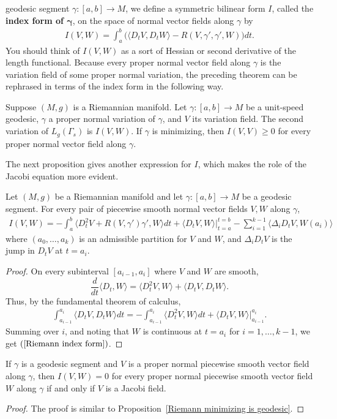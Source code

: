 geodesic segment $\gamma:[a,b]\to M$, we define a symmetric bilinear form $I$, called the \textbf{index form of $\bm{\gamma}$}, on the space of normal vector fields 
along $\gamma$ by
\begin{align}
I(V,W)=\int_a^b\big(\langle D_tV,D_tW\rangle-R(V,\gamma',\gamma',W)\big)dt.
\end{align}
You should think of $I(V,W)$ as a sort of Hessian or second derivative of the length functional. Because every proper normal vector field along $\gamma$ is the variation 
field of some proper normal variation, the preceding theorem can be rephrased in terms of the index form in the following way.
\begin{corollary}
Suppose $(M,g)$ is a Riemannian manifold. Let $\gamma:[a,b]\to M$ be a unit-speed geodesic, $\gamma$ a proper normal variation of $\gamma$, and $V$ its variation field. 
The second variation of $L_g(\Gamma_s)$ is $I(V,W)$. If $\gamma$ is minimizing, then $I(V,V)\geq 0$ for every proper normal vector field along $\gamma$.
\end{corollary}
The next proposition gives another expression for $I$, which makes the role of the Jacobi equation more evident.
\begin{proposition}
Let $(M,g)$ be a Riemannian manifold and let $\gamma:[a,b]\to M$ be a geodesic segment. For every pair of piecewise smooth normal vector fields $V,W$ along $\gamma$,
\begin{align}\label{Riemann index form}
I(V,W)=-\int_a^b\langle D_t^2V+R(V,\gamma')\gamma',W\rangle dt+\langle D_tV,W\rangle\Big|_{t=a}^{t=b}-\sum_{i=1}^{k-1}\langle\Delta_iD_tV,W(a_i)\rangle
\end{align}
where $(a_0,\dots,a_k)$ is an admissible partition for $V$ and $W$, and $\Delta_iD_tV$ is the jump in $D_tV$ at $t=a_i$.
\end{proposition}
\begin{proof}
On every subinterval $[a_{i-1},a_i]$ where $V$ and $W$ are smooth,
\[\frac{d}{dt}\langle D_t,W\rangle=\langle D_t^2V,W\rangle+\langle D_tV,D_tW\rangle.\]
Thus, by the fundamental theorem of calculus,
\begin{align*}
\int_{a_{i-1}}^{a_i}\langle D_tV,D_tW\rangle dt=-\int_{a_{i-1}}^{a_i}\langle D_t^2V,W\rangle dt+\langle D_tV,W\rangle\Big|_{a_{i-1}}^{a_i}.
\end{align*}
Summing over $i$, and noting that $W$ is continuous at $t=a_i$ for $i=1,\dots,k-1$, we get $(\ref{Riemann index form})$.
\end{proof}
\begin{corollary}
If $\gamma$ is a geodesic segment and $V$ is a proper normal piecewise smooth vector field along $\gamma$, then $I(V,W)=0$ for every proper normal piecewise smooth 
vector field $W$ along $\gamma$ if and only if $V$ is a Jacobi field.
\end{corollary}
\begin{proof}
The proof is similar to Proposition~\ref{Riemann minimizing is geodesic}.
\end{proof}
